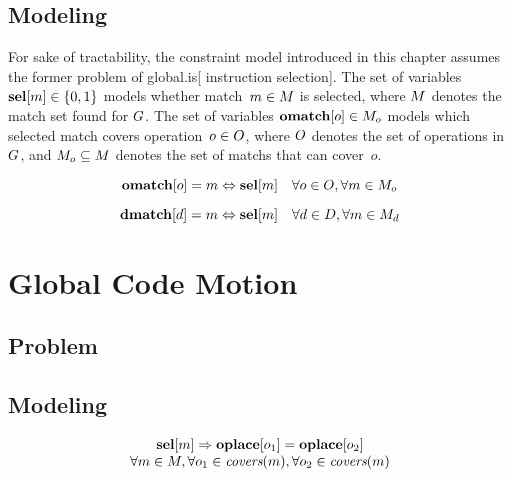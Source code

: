 \subsection{Modeling}

For sake of tractability, the constraint model introduced in this chapter
assumes the former problem of \gls{global.is}[ \gls{instruction selection}].
%
The set of \glspl{variable} \mbox{$\mVar{sel}[m] \in \mSet{0, 1}$} models
whether \gls{match}~\mbox{$m \in \mMatchSet$} is selected, where $\mMatchSet$
denotes the match set found for $G$.
%
The set of \glspl{variable} \mbox{$\mVar{omatch}[o] \in \mMatchSet[o]$} models
which selected match covers operation~\mbox{$o \in O$}, where $O$
denotes the set of operations in $G$, and \mbox{$\mMatchSet[o] \subseteq
  \mMatchSet$} denotes the set of \glspl{match} that can cover~$o$.

\begin{equation}
  \mVar{omatch}[o] = m \mEq \mVar{sel}[m]
  \mQuantSep
  \forall o \in \mOpSet,
  \forall m \in \mMatchSet[o]
  \labelEquation{operation-coverage}
\end{equation}

\begin{equation}
  \mVar{dmatch}[d] = m \mEq \mVar{sel}[m]
  \mQuantSep
  \forall d \in \mDataSet,
  \forall m \in \mMatchSet[d]
  \labelEquation{data-definitions}
\end{equation}



\section{Global Code Motion}
\subsection{Problem}
\subsection{Modeling}

\begin{equation}
  \begin{array}{c}
    \mVar{sel}[m] \mImp \mVar{oplace}[o_1] = \mVar{oplace}[o_2] \\
    \forall m \in \mMatchSet,
    \forall o_1 \in \mCovers(m),
    \forall o_2 \in \mCovers(m)
  \end{array}
  \labelEquation{operation-placement}
\end{equation}

